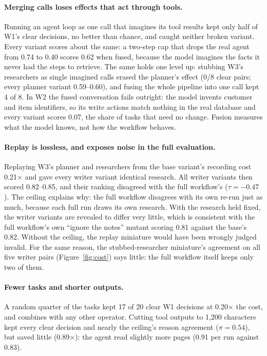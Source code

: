 \paragraph{Merging calls loses effects that act through tools.}
Running an agent loop as one call that imagines its tool results kept only half of W1's clear
decisions, no better than chance, and caught neither broken variant. Every variant scores about
the same: a two-step cap that drops the real agent from 0.74 to 0.40 scores 0.62 when fused,
because the model imagines the facts it never had the steps to retrieve. The same holds one level
up: stubbing W3's researchers as single imagined calls erased the planner's effect (0/8 clear
pairs; every planner variant 0.59--0.60), and fusing the whole pipeline into one call kept 4 of 8.
In W2 the fused conversation fails outright: the model invents customer and item identifiers, so
its write actions match nothing in the real database and every variant scores 0.07, the share of
tasks that need no change. Fusion measures what the model knows, not how the workflow behaves.

\paragraph{Replay is lossless, and exposes noise in the full evaluation.}
Replaying W3's planner and researchers from the base variant's recording cost 0.21$\times$ and
gave every writer variant identical research. All writer variants then scored 0.82--0.85, and
their ranking disagreed with the full workflow's ($\tau=-0.47$). The ceiling explains why: the
full workflow disagrees with its own re-run just as much, because each full run draws its own
research. With the research held fixed, the writer variants are revealed to differ very little,
which is consistent with the full workflow's own ``ignore the notes'' mutant scoring 0.81 against
the base's 0.82. Without the ceiling, the replay miniature would have been wrongly judged invalid.
For the same reason, the stubbed-researcher miniature's agreement on all five writer pairs
(Figure~\ref{fig:cost}) says little: the full workflow itself keeps only two of them.

\paragraph{Fewer tasks and shorter outputs.}
A random quarter of the tasks kept 17 of 20 clear W1 decisions at 0.20$\times$ the cost, and
combines with any other operator. Cutting tool outputs to 1{,}200 characters kept every clear
decision and nearly the ceiling's reason agreement ($\pi=0.54$), but saved little (0.89$\times$):
the agent read slightly more pages (0.91 per run against 0.83).

